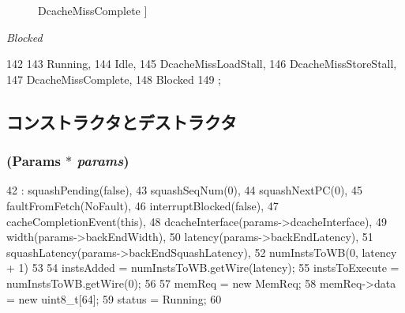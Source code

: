\begin{Desc}
\begin{description}
{\hypertarget{classInorderBackEnd_a67a0db04d321a74b7e7fcfd3f1a3f70ba1eb81f4540c1c4b90839b08ae63c5d7f}{
DcacheMissComplete}
\label{classInorderBackEnd_a67a0db04d321a74b7e7fcfd3f1a3f70ba1eb81f4540c1c4b90839b08ae63c5d7f}
}]\item[{\em 
\hypertarget{classInorderBackEnd_a67a0db04d321a74b7e7fcfd3f1a3f70ba9463ee9b8700258a1019b4b9d2d77a30}{
Blocked}
\label{classInorderBackEnd_a67a0db04d321a74b7e7fcfd3f1a3f70ba9463ee9b8700258a1019b4b9d2d77a30}
}]\end{description}
\end{Desc}




\begin{DoxyCode}
142                 {
143         Running,
144         Idle,
145         DcacheMissLoadStall,
146         DcacheMissStoreStall,
147         DcacheMissComplete,
148         Blocked
149     };
\end{DoxyCode}


\subsection{コンストラクタとデストラクタ}
\hypertarget{classInorderBackEnd_ae2482e08cc2f4d90269bf53efd5193b7}{
\subsubsection[{InorderBackEnd}]{ ({\bf Params} $\ast$ {\em params})}}
\label{classInorderBackEnd_ae2482e08cc2f4d90269bf53efd5193b7}



\begin{DoxyCode}
42     : squashPending(false),
43       squashSeqNum(0),
44       squashNextPC(0),
45       faultFromFetch(NoFault),
46       interruptBlocked(false),
47       cacheCompletionEvent(this),
48       dcacheInterface(params->dcacheInterface),
49       width(params->backEndWidth),
50       latency(params->backEndLatency),
51       squashLatency(params->backEndSquashLatency),
52       numInstsToWB(0, latency + 1)
53 {
54     instsAdded = numInstsToWB.getWire(latency);
55     instsToExecute = numInstsToWB.getWire(0);
56 
57     memReq = new MemReq;
58     memReq->data = new uint8_t[64];
59     status = Running;
60 }
\end{DoxyCode}


